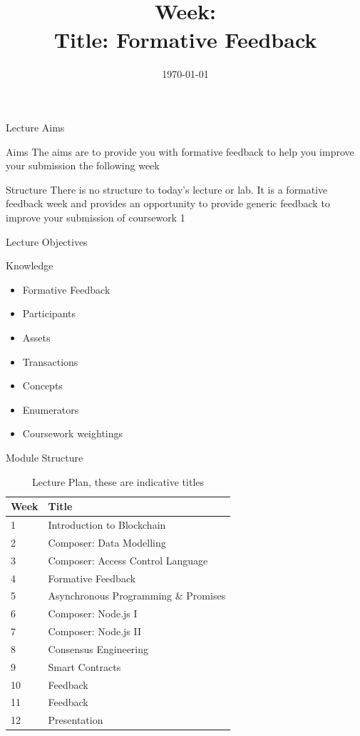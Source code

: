 \documentclass[pdf,table]{beamer}
\title[\moduleCode:L\theweek]{\moduleTitle \\ Week: \theweek \\ Title: Formative Feedback}
\institute[]{\texttt{[image: ../../../logo/mdxSmall]} \\ Middlesex University, \\Dept. of Computer Science, \\London}
\author[\email]{\moduleLeader}
\date{\today}
\begin{document}
	\begin{frame}
		\titlepage
	\end{frame}



	\begin{frame}{Lecture Aims}
		\begin{block}{Aims}
			The aims are to provide you with formative feedback to help you improve your submission the following week
		\end{block}
		\begin{block}{Structure}
			There is no structure to today's lecture or lab. It is a formative feedback week and provides an opportunity to provide generic feedback to improve your submission of coursework 1
		\end{block}
			
	\end{frame}

	\begin{frame}{Lecture Objectives}
		\begin{block}{Knowledge}
			\begin{itemize}
				\item Formative Feedback 
				\item Participants
				\item Assets
				\item Transactions
				\item Concepts
				\item Enumerators
				\item Coursework weightings
			\end{itemize}	
		\end{block}
\end{frame}


\begin{frame}{Module Structure}
\begin{table}[tbh!]
\begin{tabular}{ l l}
Week & Title \\ \hline
 1 & Introduction to Blockchain\\
 2 & Composer: Data Modelling\\
 3 & Composer: Access Control Language\\
 4 & Formative Feedback \\
 5 & Asynchronous Programming \& Promises \\ 
 6 & Composer: Node.js I \\  
 7 & Composer: Node.js II\\ 
 8 & Consensus Engineering\\
 9 & Smart Contracts\\
 10 & Feedback\\
 11 & Feedback\\
 12 &  Presentation\\
 \end{tabular}
	\caption{Lecture Plan, these are indicative titles }\label{ta:lp}
\end{table}
\end{frame}
\end{document}
